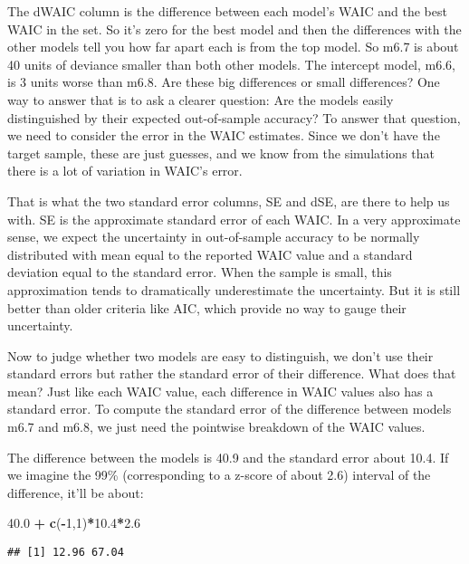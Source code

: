 \documentclass[
]{article}
\newenvironment{Shaded}{\begin{snugshade}}{\end{snugshade}}
\newcommand{\DecValTok}[1]{\textcolor[rgb]{0.00,0.00,0.81}{#1}}
\newcommand{\FloatTok}[1]{\textcolor[rgb]{0.00,0.00,0.81}{#1}}
\newcommand{\KeywordTok}[1]{\textcolor[rgb]{0.13,0.29,0.53}{\textbf{#1}}}
\newcommand{\NormalTok}[1]{#1}
\newcommand{\OperatorTok}[1]{\textcolor[rgb]{0.81,0.36,0.00}{\textbf{#1}}}
\newcommand{\StringTok}[1]{\textcolor[rgb]{0.31,0.60,0.02}{#1}}
\begin{document}
The dWAIC column is the difference between each model's WAIC and the
best WAIC in the set. So it's zero for the best model and then the
differences with the other models tell you how far apart each is from
the top model. So m6.7 is about 40 units of deviance smaller than both
other models. The intercept model, m6.6, is 3 units worse than m6.8. Are
these big differences or small differences? One way to answer that is to
ask a clearer question: Are the models easily distinguished by their
expected out-of-sample accuracy? To answer that question, we need to
consider the error in the WAIC estimates. Since we don't have the target
sample, these are just guesses, and we know from the simulations that
there is a lot of variation in WAIC's error.

That is what the two standard error columns, SE and dSE, are there to
help us with. SE is the approximate standard error of each WAIC. In a
very approximate sense, we expect the uncertainty in out-of-sample
accuracy to be normally distributed with mean equal to the reported WAIC
value and a standard deviation equal to the standard error. When the
sample is small, this approximation tends to dramatically underestimate
the uncertainty. But it is still better than older criteria like AIC,
which provide no way to gauge their uncertainty.

Now to judge whether two models are easy to distinguish, we don't use
their standard errors but rather the standard error of their difference.
What does that mean? Just like each WAIC value, each difference in WAIC
values also has a standard error. To compute the standard error of the
difference between models m6.7 and m6.8, we just need the pointwise
breakdown of the WAIC values.

The difference between the models is 40.9 and the standard error about
10.4. If we imagine the 99\% (corresponding to a z-score of about 2.6)
interval of the difference, it'll be about:

\begin{Shaded}
\begin{Highlighting}[]
  \FloatTok{40.0} \OperatorTok{+}\StringTok{ }\KeywordTok{c}\NormalTok{(}\OperatorTok{-}\DecValTok{1}\NormalTok{,}\DecValTok{1}\NormalTok{)}\OperatorTok{*}\FloatTok{10.4}\OperatorTok{*}\FloatTok{2.6}
\end{Highlighting}
\end{Shaded}

\begin{verbatim}
## [1] 12.96 67.04
\end{verbatim}
\end{document}
